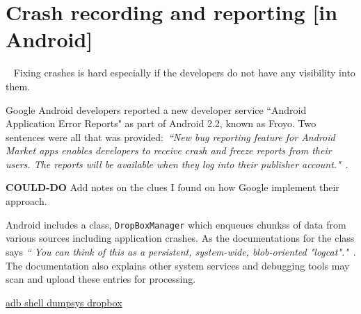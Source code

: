 \chapter{Crash recording and reporting [in Android]}~\label{chapter-crash-recording-and-reporting-in-android}
Fixing crashes is hard especially if the developers do not have any visibility into them. 


Google Android developers reported a new developer service ``Android Application Error Reports" as part of Android 2.2, known as Froyo. Two sentences were all that was provided:~\emph{``New bug reporting feature for Android Market apps enables developers to receive crash and freeze reports from their users. The reports will be available when they log into their publisher account."}~\citep{android2010_froyo_highlights_new_developer_services}.

\textbf{COULD-DO} Add notes on the clues I found on how Google implement their approach.

Android includes a class, \texttt{DropBoxManager} which enqueues chunkss of data from various sources including application crashes. As the documentations for the class says \emph{`` You can think of this as a persistent, system-wide, blob-oriented "logcat"."}~\citep{android_dropboxmanager}. The documentation also explains other system services and debugging tools may scan and upload these entries for processing.

\url{}

\href{https://github.com/operando/Android-Command-Note}{adb shell dumpsys dropbox}




